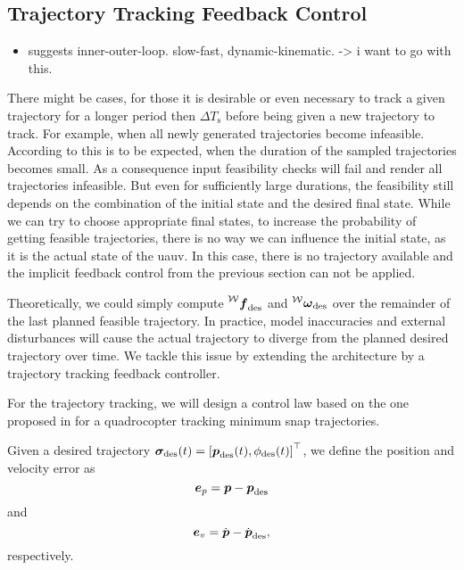 \subsection{Trajectory Tracking Feedback Control}
\begin{itemize}
	\item \cite{Maurya09} suggests inner-outer-loop. slow-fast, dynamic-kinematic. -> i want to go with this.
\end{itemize}
There might be cases, for those it is desirable or even necessary to track a given trajectory for a longer period then $\Delta T_{\text{s}}$ before being given a new trajectory to track.
For example, when all newly generated trajectories become infeasible. According to \cite{MuellerHehn15} this is to be expected, when the duration of the sampled trajectories becomes small.
As a consequence input feasibility checks will fail and render all trajectories infeasible.
But even for sufficiently large durations, the feasibility still depends on the combination of the initial state and the desired final state.
While we can try to choose appropriate final states, to increase the probability of getting feasible trajectories, there is no way we can influence the initial state, as it is the actual state of the \ac{uauv}.
In this case, there is no trajectory available and the implicit feedback control from the previous section can not be applied.

Theoretically, we could simply compute $\thrustdesiredworld$ and $\vangdesiredworld$ over the remainder of the last planned feasible trajectory.
In practice, model inaccuracies and external disturbances will cause the actual trajectory to diverge from the planned desired trajectory over time.
We tackle this issue by extending the architecture by a trajectory tracking feedback controller.

For the trajectory tracking, we will design a control law based on the one proposed in \cite{MellingerKumar11} for a quadrocopter tracking minimum snap trajectories.

Given a desired trajectory $\bm{\sigma}_{\text{des}}(t) = \left[\mbox{$\bm{p}$}_{\text{des}}(t), \phi_{\text{des}}(t)\right]^\top$, we define the position and velocity error as
\begin{equation}
	\mbox{$\bm{e}$}_{p} = \mbox{$\bm{p}$} - \mbox{$\bm{p}$}_{\text{des}}
\end{equation}
and
\begin{equation}
	\mbox{$\bm{e}$}_{v} = \mbox{$\dot{\bm{p}}$} - \mbox{$\dot{\bm{p}}$}_{\text{des}}
	,
\end{equation}
respectively.

